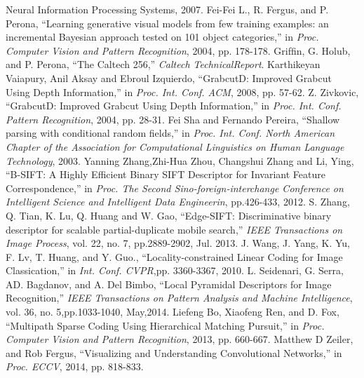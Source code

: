 \documentclass{tADR2e}
\begin{document}
\begin{thebibliography}{12}
{Neural Information Processing Systems}, 2007.
 Fei-Fei L., R. Fergus, and P. Perona, ``Learning generative visual models from few training examples: an incremental Bayesian approach tested on 101 object categories,'' in \textit{Proc. Computer Vision and Pattern Recognition}, 2004, pp. 178-178.
 Grifﬁn, G. Holub, and P. Perona, ``The Caltech 256,'' \textit{Caltech TechnicalReport}.
 Karthikeyan Vaiapury, Anil Aksay and Ebroul Izquierdo, ``GrabcutD: Improved Grabcut Using Depth Information,'' in \textit{Proc. Int. Conf. ACM}, 2008, pp. 57-62.
 Z. Zivkovic, ``GrabcutD: Improved Grabcut Using Depth Information,'' in \textit{Proc. Int. Conf. Pattern Recognition}, 2004, pp. 28-31.
 Fei Sha and Fernando Pereira, ``Shallow parsing with conditional random ﬁelds,'' in \textit{Proc. Int. Conf. North American
Chapter of the Association for Computational Linguistics on Human Language Technology}, 2003.
 Yanning Zhang,Zhi-Hua Zhou, Changshui Zhang and Li, Ying, ``B-SIFT: A Highly Efficient Binary SIFT Descriptor for Invariant Feature Correspondence,'' in \textit{Proc. The Second Sino-foreign-interchange Conference on Intelligent Science and Intelligent Data Engineerin}, pp.426-433, 2012.
 S. Zhang, Q. Tian, K. Lu, Q. Huang and W. Gao, ``Edge-SIFT: Discriminative binary descriptor for scalable partial-duplicate mobile search,'' \textit{IEEE Transactions on Image Process}, vol. 22, no. 7, pp.2889-2902, Jul. 2013.
 J. Wang, J. Yang, K. Yu, F. Lv, T. Huang, and Y. Guo., ``Locality-constrained Linear Coding for Image Classication,'' in \textit{Int. Conf. CVPR},pp. 3360-3367, 2010.
 L. Seidenari, G. Serra, AD. Bagdanov, and A. Del Bimbo, ``Local Pyramidal Descriptors for Image Recognition,'' \textit{IEEE Transactions on Pattern Analysis and Machine Intelligence}, vol. 36, no. 5,pp.1033-1040, May,2014.
 Liefeng Bo, Xiaofeng Ren, and D. Fox, ``Multipath Sparse Coding Using Hierarchical Matching Pursuit,'' in \textit{Proc. Computer Vision and Pattern Recognition}, 2013, pp. 660-667.
 Matthew D Zeiler, and Rob Fergus, ``Visualizing and Understanding Convolutional Networks,'' in \textit{Proc. ECCV}, 2014,  pp. 818-833.

\end{thebibliography}
\end{document}
